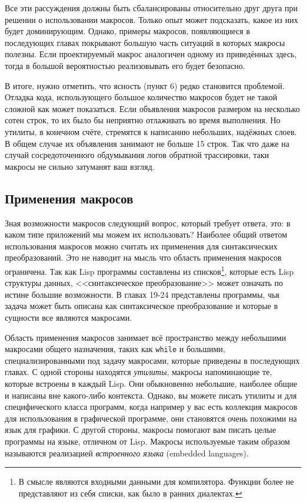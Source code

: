 \documentclass[12pt, a4paper]{article} %
\begin{document}
Все эти рассуждения должны быть сбалансированы относительно друг друга при решении о использовании макросов. Только опыт может подсказать, какое из них будет доминирующим. Однако, примеры макросов, появляющиеся в последующих главах покрывают большую часть ситуаций в которых макросы полезны. Если проектируемый макрос аналогичен одному из приведённых здесь, тогда в большой вероятностью реализовывать его будет безопасно.

В итоге, нужно отметить, что ясность (пункт 6) редко становится проблемой. Отладка кода, использующего большое количество макросов будет не такой сложной как может показаться. Если объявления макросов размером на несколько сотен строк, то их было бы неприятно отлаживать во время выполнения. Но утилиты, в конечном счёте, стремятся к написанию небольших, надёжных слоев. В общем случае их объявления занимают не больше 15 строк. Так что даже на случай сосредоточенного обдумывания логов обратной трассировки, таки макросы не сильно затуманят ваш взгляд.


\subsection{Применения макросов}

Зная возможности макросов следующий вопрос, который требует ответа, это: в каком типе приложений мы можем их использовать? Наиболее общий ответом использования макросов можно считать их применения для синтаксических преобразований. Это не наводит на мысль что область применения макросов ограничена. Так как Lisp программы составлены из списков\footnote{В смысле являются входными данными для компилятора. Функции более не представляют из себя списки, как было в ранних диалектах. }, которые есть Lisp структуры данных, <<синтаксическое преобразование>> может означать по истине большие возможности. В главах 19-24 представлены программы, чья задача может быть описана как синтаксическое преобразование и которые в сущности все являются макросами.

Область применения макросов занимает всё пространство между небольшими макросами общего назначения, таких как \texttt{while} и большими, специализированными под задачу макросами, которые приведены в последующих главах. С одной стороны находятся \textit{утилиты}, макросы напоминающие те, которые встроены в каждый Lisp. Они обыкновенно небольшие, наиболее общие и написаны вне какого-либо контекста. Однако, вы можете писать утилиты и для специфического класса программ, когда например у вас есть коллекция макросов для использования в графической программе, они становятся очень похожими на язык для графики. С другой стороны, макросы помогают вам писать целые программы на языке, отличном от Lisp. Макросы используемые таким образом называются реализацией \textit{встроенного языка} (embedded languages).
\end{document}

